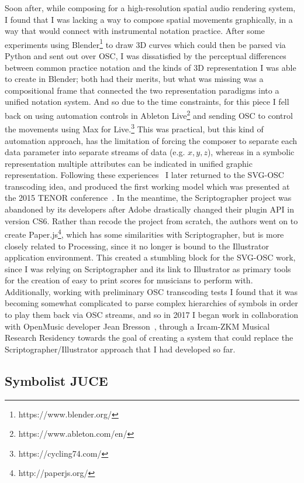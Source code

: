 \documentclass{article}
\begin{document}
Soon after, while composing for a high-resolution spatial audio rendering system, I found that I was lacking a way to compose spatial movements graphically, in a way that would connect with instrumental notation practice.
After some experiments using Blender\footnote{https://www.blender.org/} to draw 3D curves which could then be parsed via Python and sent out over OSC, I was dissatisfied by the perceptual differences between common practice notation and the kinds of 3D representation I was able to create in Blender; both had their merits, but what was missing was a compositional frame that connected the two representation paradigms into a unified notation system.
And so due to the time constraints, for this piece I fell back on using automation controls in Ableton Live\footnote{https://www.ableton.com/en/} and sending OSC to control the movements using Max for Live.\footnote{https://cycling74.com/}
This was practical, but this kind of automation approach, has the limitation of forcing the composer to separate each data parameter into separate streams of data (e.g. $x, y, z$), whereas in a symbolic representation multiple attributes can be indicated in unified graphic representation. 
Following these experiences~\cite{gottfried2013studies} I later returned to the SVG-OSC transcoding idea, and produced the first working model which was presented at the 2015 TENOR conference~\cite{gottfried2015svg}.
In the meantime, the Scriptographer project was abandoned by its developers after Adobe drastically changed their plugin API in version CS6. Rather than recode the project from scratch, the authors went on to create Paper.js\footnote{http://paperjs.org/}, which has some similarities with Scriptographer, but is more closely related to Processing, since it no longer is bound to the Illustrator application environment. This created a stumbling block for the SVG-OSC work, since I was relying on Scriptographer and its link to Illustrator as primary tools for the creation of easy to print scores for musicians to perform with. Additionally, working with preliminary OSC transcoding tests I found that it was becoming somewhat complicated to parse complex hierarchies of symbols in order to play them back via OSC streams, and so in 2017 I began work in collaboration with OpenMusic developer Jean Bresson~\cite{bresson2011om}, through a Ircam-ZKM Musical Research Residency towards the goal of creating a system that could replace the Scriptographer/Illustrator approach that I had developed so far.

\subsection*{Symbolist JUCE}\label{sec:juce_version}
\end{document}
